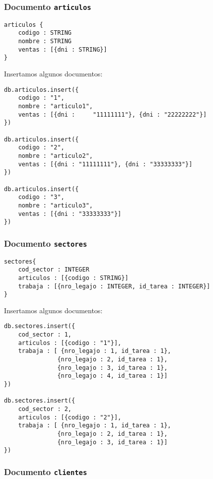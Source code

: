 \subsubsection{Documento \texttt{articulos}}

\begin{verbatim}
articulos {
    codigo : STRING
    nombre : STRING
    ventas : [{dni : STRING}]
}
\end{verbatim}

Insertamos algunos documentos:

\begin{verbatim}
db.articulos.insert({
    codigo : "1",
    nombre : "articulo1",
    ventas : [{dni :	 "11111111"}, {dni : "22222222"}]
})

db.articulos.insert({
    codigo : "2",
    nombre : "articulo2",
    ventas : [{dni : "11111111"}, {dni : "33333333"}]
})

db.articulos.insert({
    codigo : "3",
    nombre : "articulo3",
    ventas : [{dni : "33333333"}]
})
\end{verbatim}

\subsubsection{Documento \texttt{sectores}}

\begin{verbatim}
sectores{
    cod_sector : INTEGER
    articulos : [{codigo : STRING}]
    trabaja : [{nro_legajo : INTEGER, id_tarea : INTEGER}]
}
\end{verbatim}

Insertamos algunos documentos:

\begin{verbatim}
db.sectores.insert({
    cod_sector : 1,
    articulos : [{codigo : "1"}],
    trabaja : [	{nro_legajo : 1, id_tarea : 1},
               {nro_legajo : 2, id_tarea : 1},
               {nro_legajo : 3, id_tarea : 1},
               {nro_legajo : 4, id_tarea : 1}]
})

db.sectores.insert({
    cod_sector : 2,
    articulos : [{codigo : "2"}],
    trabaja : [	{nro_legajo : 1, id_tarea : 1},
               {nro_legajo : 2, id_tarea : 1},
               {nro_legajo : 3, id_tarea : 1}]
})
\end{verbatim}

\subsubsection{Documento \texttt{clientes}}


